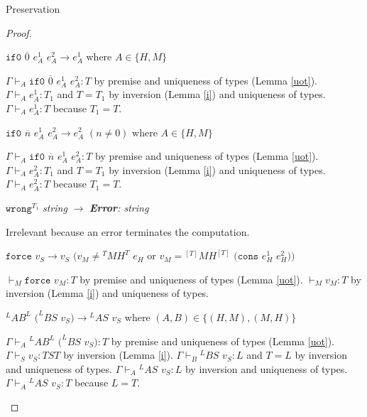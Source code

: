 \begin{theorem}{Preservation}
\begin{proof}

\begin{case}
$\mathtt{if0}$ $\overline{0}$ $e_{A}^{1}$ $e_{A}^{2}\rightarrow e_{A}^{1}$ where $A\in\lbrace H,M\rbrace$

$\Gamma\vdash_{A}\mathtt{if0}$ $\overline{0}$ $e_{A}^{1}$ $e_{A}^{2}:T$ by premise and uniqueness of types (Lemma \ref{uot}).  $\Gamma\vdash_{A}e_{A}^{1}:T_{1}$ and $T=T_{1}$ by inversion (Lemma \ref{i}) and uniqueness of types.  $\Gamma\vdash_{A}e_{A}^{1}:T$ because $T_{1}=T$.
\end{case}


\begin{case}
$\mathtt{if0}$ $\overline{n}$ $e_{A}^{1}$ $e_{A}^{2}\rightarrow e_{A}^{2}$ $(n\neq0)$ where $A\in\lbrace H,M\rbrace$

$\Gamma\vdash_{A}\mathtt{if0}$ $\overline{n}$ $e_{A}^{1}$ $e_{A}^{2}:T$ by premise and uniqueness of types (Lemma \ref{uot}).  $\Gamma\vdash_{A}e_{A}^{2}:T_{1}$ and $T=T_{1}$ by inversion (Lemma \ref{i}) and uniqueness of types.  $\Gamma\vdash_{A}e_{A}^{2}:T$ because $T_{1}=T$.
\end{case}


\begin{case}
$\mathtt{wrong}^{T_{1}}$ \emph{string} $\rightarrow$ \emph{\textbf{Error}: string}

Irrelevant because an error terminates the computation.
\end{case}


\begin{case}

$\mathtt{force}$ $v_{S}\rightarrow v_{S}$ $(v_{M}\neq{^{T}M}H^{T}$ $e_{H}$ or $v_{M}={^{[T]}M}H^{[T]}$ $(\mathtt{cons}$ $e_{H}^{1}$ $e_{H}^{2}))$

$\vdash_{M}\mathtt{force}$ $v_{M}:T$ by premise and uniqueness of types (Lemma \ref{uot}).  $\vdash_{M}v_{M}:T$ by inversion (Lemma \ref{i}) and uniqueness of types.

\end{case}


\begin{case}
$^{L}AB^{L}$ $(^{L}BS$ $v_{S})\rightarrow{^{L}A}S$ $v_{S}$ where $(A,B)\in\lbrace(H,M),(M,H)\rbrace$

$\Gamma\vdash_{A}{^{L}A}B^{L}$ $(^{L}BS$ $v_{S}):T$ by premise and uniqueness of types (Lemma \ref{uot}).  $\Gamma\vdash_{S}v_{S}:TST$ by inversion (Lemma \ref{i}).  $\Gamma\vdash_{B}{^{L}B}S$ $v_{S}:L$ and $T=L$ by inversion and uniqueness of types.  $\Gamma\vdash_{A}{^{L}A}S$ $v_{S}:L$ by inversion and uniqueness of types.  $\Gamma\vdash_{A}{^{L}A}S$ $v_{S}:T$ because $L=T$.
\end{case}


\end{proof}
\end{theorem}
